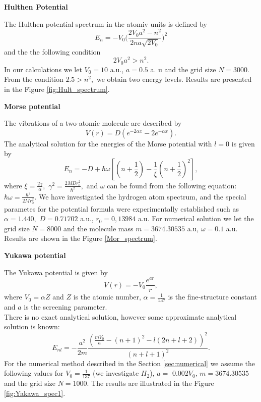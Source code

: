 \documentclass[a4paper, 11pt]{article}
\begin{document}
\begin{center}
		\large
		\textbf{Hulthen Potential}		\\[0.5 cm]
\end{center}
The Hulthen potential spectrum in the atomiv units is defined by
$$E_n = -V_0\bigg(\frac{2 V_0 a^2 - n^2}{2n a \sqrt{2V_0}}\bigg)^2$$
and the the following condition
$$2 V_0 a^2 > n^2.$$
In our calculations we let  $V_0 = 10$ a.u., $a = 0.5$ a. u and the grid size $N = 3000$.  From the condition  $2.5 > n^2,$ we obtain  two energy levels. Results are presented in the Figure \ref{fig:Hult_spectrum}.


\begin{center}
		\large
		\textbf{Morse potential}		\\[0.5 cm]
\end{center}
The vibrations of a two-atomic molecule are described by
$$V(r) = D(e^{-2\alpha x} - 2e^{-\alpha x}).$$
The analytical solution for the energies of the Morse potential with $l=0$ is given by
$$E_n = -D + \hbar \omega [(n+\frac{1}{2}) - \frac{1}{\xi}(n+\frac{1}{2})^2],$$
where $\xi = \frac{2 \gamma}{\alpha},$ $\gamma^2 = \frac{2 M D r_0^2}{\hbar^2},$ and $\omega$ can be found from the following equation: $\hbar \omega = \frac{\hbar^2}{2 M  r_0^2}.$
We have investigated  the hydrogen atom spectrum, and the special parametes for the potential formula were experimentally established such as $\alpha = 1.440,$  $D= 0.71702$ a.u., $r_0= 0,13984$ a.u. For numerical solution we let the grid size $N = 8000$ and the molecule mass $m = 3674.30535 $ a.u, $\omega  = 0.1 $ a.u. Results are shown in the Figure \ref{Mor_spectrum}.

\begin{center}
		\large
		\textbf{Yukawa potential}		\\[0.5 cm]
\end{center}
The Yukawa potential is given by
\begin{equation}\label{yukawa_pot}
    V(r) = -V_0\frac{e^{a r}}{r},
\end{equation}
where $V_0 = \alpha Z$ and $Z$ is the atomic number, $\alpha = \frac{1}{137}$ is the fine-structure constant and $a$ is the screening parameter.\\
There is no exact analytical solution, however some approximate analytical solution is known: 
$$E_{nl} = -\frac{a^2}{2m}\frac{(\displaystyle{\frac{m V_0}{a}} - (n+1)^2 - l(2n+l+2))^2}{(n+l+1)^2}.$$
For the numerical method described in the Section \ref{sec:numerical} we assume the following values for $V_0 = \frac{1}{137}$ (we investigate $H_2$), $a =$ 0.002$V_0$,  $m = 3674.30535 $ and the grid size $N = 1000.$ The results are illustrated in the Figure \ref{fig:Yakawa_spec1}.






\end{document}
